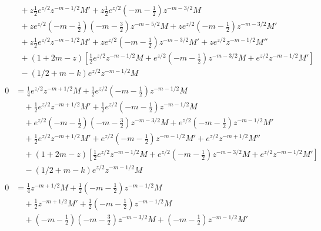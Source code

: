\documentclass[a4paper,12pt, leqno, answers]{exam}
\begin{document}
\begin{questions}
\begin{solution}
\begin{align*}
\begin{split}
                &\quad {}+ z \frac{1}{2} e^{z/2} z^{-m - 1/2} M' + z \frac{1}{2} e^{z/2} \left( -m - \frac{1}{2} \right)  z^{-m - 3/2} M \\
                &\quad {}+ z e^{z/2} \left( -m - \frac{1}{2} \right) \left( -m - \frac{3}{2} \right) z^{-m - 5/2} M + z e^{z/2} \left( -m - \frac{1}{2} \right) z^{-m - 3/2} M' \\
                &\quad {}+ z \frac{1}{2} e^{z/2} z^{-m - 1/2} M' + z e^{z/2} \left( -m - \frac{1}{2} \right) z^{-m - 3/2} M' + z e^{z/2} z^{-m - 1/2} M'' \\
                &\quad {}+ (1 + 2 m - z) \left[ \frac{1}{2} e^{z/2} z^{-m - 1/2} M + e^{z/2} \left( -m - \frac{1}{2} \right) z^{-m - 3/2} M + e^{z/2} z^{-m - 1/2} M' \right] \\
                &\quad {}- (1/2 + m - k) e^{z/2} z^{-m - 1/2} M
            \end{split} \\
            \begin{split}
                0 &= \frac{1}{4} e^{z/2} z^{-m + 1/2} M + \frac{1}{2} e^{z/2} \left( -m - \frac{1}{2} \right) z^{-m - 1/2} M \\
                &\quad {}+ \frac{1}{2} e^{z/2} z^{-m + 1/2} M' + \frac{1}{2} e^{z/2} \left( -m - \frac{1}{2} \right) z^{-m - 1/2} M \\
                &\quad {}+ e^{z/2} \left( -m - \frac{1}{2} \right) \left( -m - \frac{3}{2} \right) z^{-m - 3/2} M + e^{z/2} \left( -m - \frac{1}{2} \right) z^{-m - 1/2} M' \\
                &\quad {}+ \frac{1}{2} e^{z/2} z^{-m + 1/2} M' + e^{z/2} \left( -m - \frac{1}{2} \right) z^{-m - 1/2} M' + e^{z/2} z^{-m + 1/2} M'' \\
                &\quad {}+ (1 + 2 m - z) \left[ \frac{1}{2} e^{z/2} z^{-m - 1/2} M + e^{z/2} \left( -m - \frac{1}{2} \right) z^{-m - 3/2} M + e^{z/2} z^{-m - 1/2} M' \right] \\
                &\quad {}- (1/2 + m - k) e^{z/2} z^{-m - 1/2} M
            \end{split} \\
            \begin{split}
                0 &= \frac{1}{4} z^{-m + 1/2} M + \frac{1}{2} \left( -m - \frac{1}{2} \right) z^{-m - 1/2} M \\
                &\quad {}+ \frac{1}{2} z^{-m + 1/2} M' + \frac{1}{2} \left( -m - \frac{1}{2} \right) z^{-m - 1/2} M \\
                &\quad {}+ \left( -m - \frac{1}{2} \right) \left( -m - \frac{3}{2} \right) z^{-m - 3/2} M + \left( -m - \frac{1}{2} \right) z^{-m - 1/2} M' \\

\end{split}
\end{align*}
\end{solution}
\end{questions}
\end{document}
